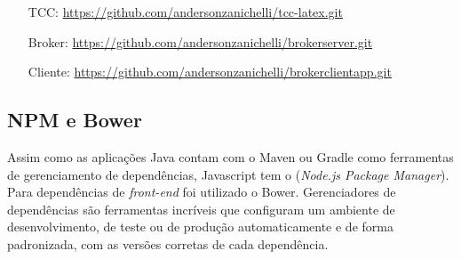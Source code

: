 \begin{footnotesize}
  \begin{itemize}
  \item[TCC:] \url{https://github.com/andersonzanichelli/tcc-latex.git}
  \item[Broker:] \url{https://github.com/andersonzanichelli/brokerserver.git}
  \item[Cliente:] \url{https://github.com/andersonzanichelli/brokerclientapp.git}
  \end{itemize}
\end{footnotesize}

\subsection{NPM e Bower}
Assim como as aplicações Java contam com o Maven ou Gradle como ferramentas de gerenciamento de dependências, Javascript tem o  (\textit{Node.js Package Manager}). Para dependências de \textit{front-end} foi utilizado o Bower.
Gerenciadores de dependências são ferramentas incríveis que configuram um ambiente de desenvolvimento, de teste ou de produção automaticamente e de forma padronizada, com as versões corretas de cada dependência.